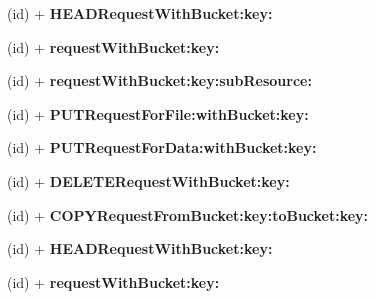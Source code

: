 \begin{DoxyCompactItemize}
\item 
\hypertarget{interface_a_s_i_s3_object_request_a88538201f1def9da2ff385880b78c8ef}{
(id) + {\bfseries \-H\-E\-A\-D\-Request\-With\-Bucket\-:key\-:}}
\label{interface_a_s_i_s3_object_request_a88538201f1def9da2ff385880b78c8ef}

\item 
\hypertarget{interface_a_s_i_s3_object_request_a8fc06d7585b85db69f81678fc1560ab0}{
(id) + {\bfseries request\-With\-Bucket\-:key\-:}}
\label{interface_a_s_i_s3_object_request_a8fc06d7585b85db69f81678fc1560ab0}

\item 
\hypertarget{interface_a_s_i_s3_object_request_aac357e6e8d9eab201a5d97c6e2ad1574}{
(id) + {\bfseries request\-With\-Bucket\-:key\-:sub\-Resource\-:}}
\label{interface_a_s_i_s3_object_request_aac357e6e8d9eab201a5d97c6e2ad1574}

\item 
\hypertarget{interface_a_s_i_s3_object_request_a07ff4bdb86902d59cb602be9bdc7ac14}{
(id) + {\bfseries \-P\-U\-T\-Request\-For\-File\-:with\-Bucket\-:key\-:}}
\label{interface_a_s_i_s3_object_request_a07ff4bdb86902d59cb602be9bdc7ac14}

\item 
\hypertarget{interface_a_s_i_s3_object_request_a06b5bf032c9b54a0fd0b17e0d1fecad5}{
(id) + {\bfseries \-P\-U\-T\-Request\-For\-Data\-:with\-Bucket\-:key\-:}}
\label{interface_a_s_i_s3_object_request_a06b5bf032c9b54a0fd0b17e0d1fecad5}

\item 
\hypertarget{interface_a_s_i_s3_object_request_a0602fac9aee5730f513b0a49e2be0dd9}{
(id) + {\bfseries \-D\-E\-L\-E\-T\-E\-Request\-With\-Bucket\-:key\-:}}
\label{interface_a_s_i_s3_object_request_a0602fac9aee5730f513b0a49e2be0dd9}

\item 
\hypertarget{interface_a_s_i_s3_object_request_a0048cc08b9cfef9c78abd81faa472d48}{
(id) + {\bfseries \-C\-O\-P\-Y\-Request\-From\-Bucket\-:key\-:to\-Bucket\-:key\-:}}
\label{interface_a_s_i_s3_object_request_a0048cc08b9cfef9c78abd81faa472d48}

\item 
\hypertarget{interface_a_s_i_s3_object_request_a88538201f1def9da2ff385880b78c8ef}{
(id) + {\bfseries \-H\-E\-A\-D\-Request\-With\-Bucket\-:key\-:}}
\label{interface_a_s_i_s3_object_request_a88538201f1def9da2ff385880b78c8ef}

\item 
\hypertarget{interface_a_s_i_s3_object_request_a8fc06d7585b85db69f81678fc1560ab0}{
(id) + {\bfseries request\-With\-Bucket\-:key\-:}}
\label{interface_a_s_i_s3_object_request_a8fc06d7585b85db69f81678fc1560ab0}


\end{DoxyCompactItemize}
